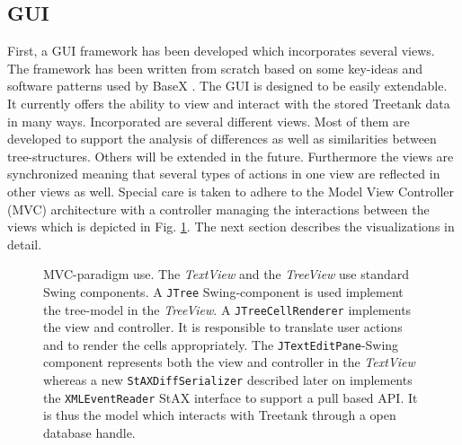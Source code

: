 \subsection{GUI}
First, a GUI framework has been developed which incorporates several views. The framework has been written from scratch based on some key-ideas and software patterns used by BaseX \cite{BASEX}. The GUI is designed to be easily extendable. It currently offers the ability to view and interact with the stored Treetank data in many ways. Incorporated are several different views. Most of them are developed to support the analysis of differences as well as similarities between tree-structures. Others will be extended in the future. Furthermore the views are synchronized meaning that several types of actions in one view are reflected in other views as well. Special care is taken to adhere to the Model View Controller (MVC) architecture with a controller managing the interactions between the views which is depicted in Fig. \ref{fig:mvc}. The next section describes the visualizations in detail.

\begin{figure}[tb]
\caption{\label{fig:mvc} MVC-paradigm use. The \emph{TextView} and the \emph{TreeView} use standard Swing components. A \texttt{JTree} Swing-component is used implement the tree-model in the \emph{TreeView}. A \texttt{JTreeCellRenderer} implements the view and controller. It is responsible to translate user actions and to render the cells appropriately. The \texttt{JTextEditPane}-Swing component represents both the view and controller in the \emph{TextView} whereas a new \texttt{StAXDiffSerializer} described later on implements the \texttt{XMLEventReader} StAX interface to support a pull based API. It is thus the model which interacts with Treetank through a open database handle.}\end{figure} 

